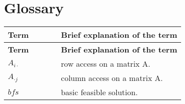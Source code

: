 \documentclass[main]{subfiles}
\begin{document}
\section{Glossary}
\renewcommand{\arraystretch}{1.5}


\begin{longtable}{p{0.3\linewidth} p{0.7\linewidth}}
\hline \textbf{Term} & \textbf{Brief explanation of the term}\\ \hline
\endfirsthead

\hline \textbf{Term} & \textbf{Brief explanation of the term}\\ \hline\hline
\endhead
$A_{i\cdot}$ & row access on a matrix A.\\
$A_{\cdot j}$ & column access on a matrix A.\\
$bfs$ & basic feasible solution. \\

\end{longtable}
\end{document}

